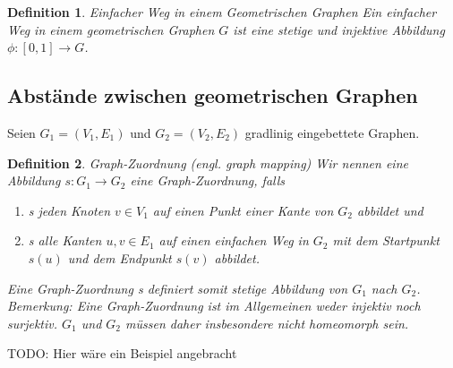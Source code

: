 \documentclass[a4paper, 12pt, twoside]{article}
\theoremstyle{Format1} %
\newtheorem{Def}{Definition}[section]       %
\begin{document}
\begin{Def}
	Einfacher Weg in einem Geometrischen Graphen
	Ein \textit{einfacher Weg} in einem geometrischen Graphen $G$ ist eine stetige und injektive Abbildung $ \phi: [0, 1] \to G$.
\end{Def}

\subsection{Abstände zwischen geometrischen Graphen}

Seien $ G_1=(V_1, E_1) $ und $ G_2=(V_2, E_2) $ gradlinig eingebettete Graphen.
\begin{Def}
	Graph-Zuordnung (engl. graph mapping)
	Wir nennen eine Abbildung $s: G_1 \to G_2 $ eine \textit{Graph-Zuordnung}, falls
    	\begin{enumerate}
		\item[1)] s jeden Knoten $ v \in V_1 $ auf einen Punkt einer Kante von $ G_2 $ abbildet und
		\item[2)] s alle Kanten $ {u,v} \in E_1 $ auf einen einfachen Weg in $G_2$ mit dem Startpunkt $s(u)$ und dem Endpunkt $s(v)$ abbildet.
    	\end{enumerate}

	Eine Graph-Zuordnung s definiert somit stetige Abbildung von $ G_1 $ nach $ G_2 $.\\
	Bemerkung: Eine Graph-Zuordnung ist im Allgemeinen weder injektiv noch surjektiv.
	$ G_1 $ und $ G_2 $ müssen daher insbesondere nicht homeomorph sein.

\end{Def}

TODO: Hier wäre ein Beispiel angebracht
\end{document}
